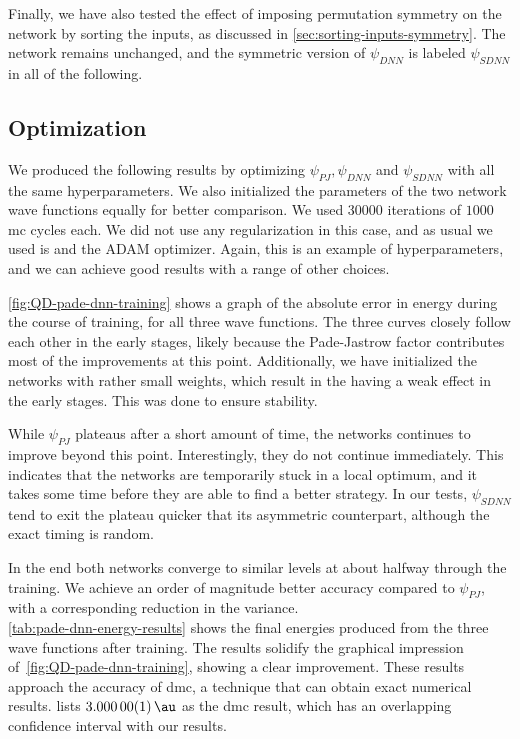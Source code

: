 \documentclass[Thesis.tex]{subfiles}
\begin{document}
Finally, we have also tested the effect of imposing permutation symmetry on the
network by sorting the inputs, as discussed in
\cref{sec:sorting-inputs-symmetry}. The network remains unchanged, and the
symmetric version of $\psi_{DNN}$ is labeled $\psi_{SDNN}$ in all of the following.


\subsection{Optimization}

We produced the following results by optimizing $\psi_{PJ}, \psi_{DNN}$ and
$\psi_{SDNN}$ with all the same hyperparameters. We also initialized the
parameters of the two network wave functions equally for better comparison.
We used $\num{30000}$ iterations of $1000$ \gls{mc} cycles each. We did not use any
regularization in this case, and as usual we used \acrlong{is} and the
ADAM optimizer. Again, this is an example of hyperparameters, and we can
achieve good results with a range of other choices.

\cref{fig:QD-pade-dnn-training} shows a graph of the absolute error in energy
during the course of training, for all three wave functions. The three curves
closely follow each other in the early stages, likely because the Pade-Jastrow
factor contributes most of the improvements at this point. Additionally, we have
initialized the networks with rather small weights, which result in the having a
weak effect in the early stages. This was done to ensure stability.

While $\psi_{PJ}$ plateaus after a short amount of time, the
networks continues to improve beyond this point. Interestingly, they do not
continue immediately. This indicates that the networks are temporarily stuck in
a local optimum, and it takes some time before they are able to find a better
strategy. In our tests, $\psi_{SDNN}$ tend to exit the plateau quicker that its
asymmetric counterpart, although the exact timing is random.

In the end both networks converge to similar levels at about halfway through the
training. We achieve an order of magnitude better accuracy compared to $\psi_{PJ}$, with a corresponding
reduction in the variance.\\

\cref{tab:pade-dnn-energy-results} shows the final energies produced from the
three wave functions after training. The results solidify the graphical impression
of~\cref{fig:QD-pade-dnn-training}, showing a clear improvement. These results
approach the accuracy of \gls{dmc}, a technique that can obtain
exact numerical results. \textcite{Pedersen-2011} lists $\SI{3.00000(1)}{\au}$
as the \gls{dmc} result, which has an overlapping confidence interval with our results.
\end{document}
